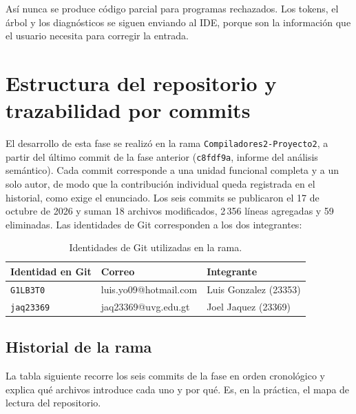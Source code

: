 \documentclass[11pt,a4paper]{article}
\begin{document}
Así nunca se produce código parcial para programas rechazados. Los tokens, el
árbol y los diagnósticos se siguen enviando al IDE, porque son la información
que el usuario necesita para corregir la entrada.

\section{Estructura del repositorio y trazabilidad por commits}

El desarrollo de esta fase se realizó en la rama \texttt{Compiladores2-Proyecto2},
a partir del último commit de la fase anterior (\texttt{c8fdf9a}, informe del
análisis semántico). Cada commit corresponde a una unidad funcional completa y a
un solo autor, de modo que la contribución individual queda registrada en el
historial, como exige el enunciado. Los seis commits se publicaron el 17 de
octubre de 2026 y suman 18 archivos modificados, 2\,356 líneas agregadas y 59
eliminadas. Las identidades de Git corresponden a los dos integrantes:

\begin{table}[H]
\centering
\small
\begin{tabular}{lll}
\toprule
\textbf{Identidad en Git} & \textbf{Correo} & \textbf{Integrante} \\
\midrule
\texttt{G1LB3T0}  & luis.yo09@hotmail.com & Luis Gonzalez (23353) \\
\texttt{jaq23369} & jaq23369@uvg.edu.gt   & Joel Jaquez (23369) \\
\bottomrule
\end{tabular}
\caption{Identidades de Git utilizadas en la rama.}
\end{table}

\subsection{Historial de la rama}

La tabla siguiente recorre los seis commits de la fase en orden cronológico y
explica qué archivos introduce cada uno y por qué. Es, en la práctica, el mapa
de lectura del repositorio.
\end{document}
